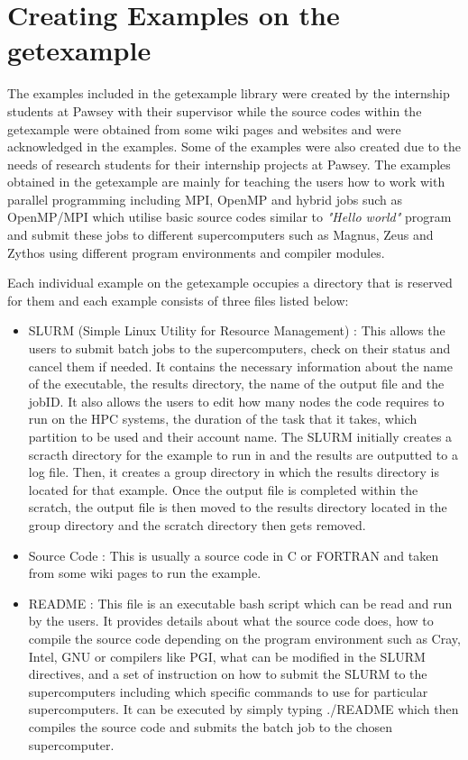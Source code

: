 \section{Creating Examples on the getexample}

The examples included in the getexample library were created by the internship students at Pawsey with their supervisor while the source codes within the
getexample were obtained from some wiki pages and websites and were acknowledged in the examples. Some of the examples were also created due to the
needs of research students for their internship projects at Pawsey. The examples obtained in the getexample are mainly for teaching the users how to work
with parallel programming including MPI, OpenMP and hybrid jobs such as OpenMP/MPI which utilise basic source codes similar to \emph{"Hello world"} 
program and submit these jobs to different supercomputers such as Magnus, Zeus and Zythos using different program environments and compiler modules. 

Each individual example on the getexample occupies a directory that is reserved for them and each example consists of three files listed below:

\begin{itemize}    
\item SLURM (Simple Linux Utility for Resource Management) : This allows the users to submit batch jobs to the supercomputers, check on their status and 
cancel them if needed. It contains the necessary information about the name of the executable, the results directory, the name of the output file and 
the jobID. It also allows the users to edit how many nodes the code requires to run on the HPC systems, the duration of the task that it takes, which 
partition to be used and their account name. The SLURM initially creates a scracth directory for the example to run in and the results are outputted to 
a log file. Then, it creates a group directory in which the results directory is located for that example. Once the output file is completed within the 
scratch, the output file is then moved to the results directory located in the group directory and the scratch directory then gets removed.
\item Source Code : This is usually a source code in C or FORTRAN and taken from some wiki pages to run the example.
\item README : This file is an executable bash script which can be read and run by the users. It provides details about what the source code does,
how to compile the source code depending on the program environment such as Cray, Intel, GNU or compilers like PGI, what can be modified in the SLURM 
directives, and a set of instruction on how to submit the SLURM to the supercomputers including which specific commands to use for particular 
supercomputers. It can be executed by simply typing ./README which then compiles the source code and submits the batch job to the chosen supercomputer.
\end{itemize}

